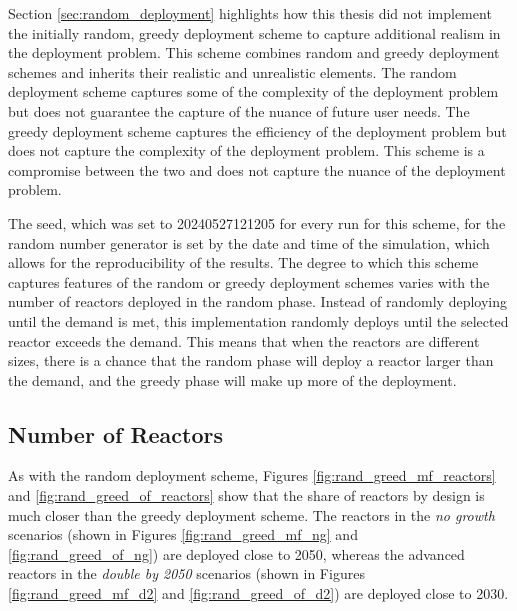 
Section \ref{sec:random_deployment} highlights how this thesis did not implement the initially random, greedy deployment scheme to capture additional realism in the deployment problem. This scheme combines random and greedy deployment schemes and inherits their realistic and unrealistic elements. The random deployment scheme captures some of the complexity of the deployment problem but does not guarantee the capture of the nuance of future user needs. The greedy deployment scheme captures the efficiency of the deployment problem but does not capture the complexity of the deployment problem. This scheme is a compromise between the two and does not capture the nuance of the deployment problem.

The seed, which was set to 20240527121205 for every run for this scheme, for
the random number generator is set by the date and time of the simulation,
which allows for the reproducibility of the results. The degree to which this
scheme captures features of the random or greedy deployment schemes varies with
the number of reactors deployed in the random phase. Instead of randomly
deploying until the demand is met, this implementation randomly deploys until
the selected reactor exceeds the demand. This means that when the reactors are
different sizes, there is a chance that the random phase will deploy a reactor
larger than the demand, and the greedy phase will make up more of
the deployment.


\subsection{Number of Reactors}
\label{sec:rand_greed_reactors}

As with the random deployment scheme, Figures
\ref{fig:rand_greed_mf_reactors} and \ref{fig:rand_greed_of_reactors} show that the share of reactors by design is much closer than the greedy deployment scheme. The reactors in the \textit{no growth} scenarios (shown in Figures \ref{fig:rand_greed_mf_ng} and \ref{fig:rand_greed_of_ng}) are deployed close to 2050, whereas the advanced reactors in the \textit{double by 2050} scenarios (shown in Figures \ref{fig:rand_greed_mf_d2} and \ref{fig:rand_greed_of_d2}) are deployed close to 2030.

